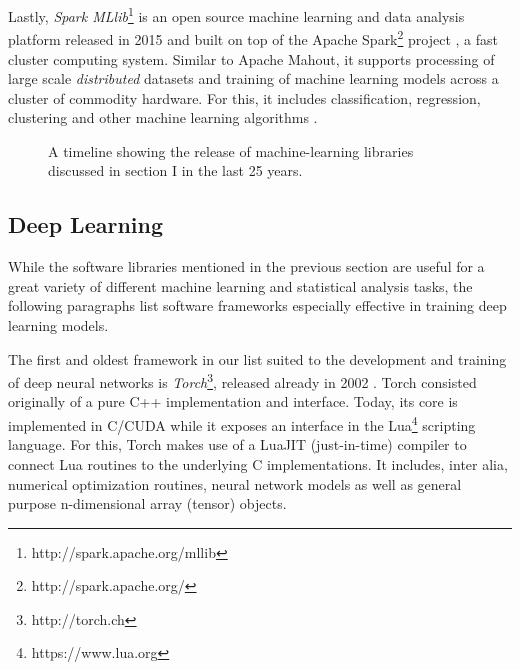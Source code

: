 Lastly, \emph{Spark MLlib}\footnote{http://spark.apache.org/mllib} is an
open source machine learning and data analysis platform released in 2015 and
built on top of the Apache Spark\footnote{http://spark.apache.org/} project
\cite{spark}, a fast cluster computing system. Similar to Apache Mahout, it
supports processing of large scale \emph{distributed} datasets and training of
machine learning models across a cluster of commodity hardware. For this, it
includes classification, regression, clustering and other machine learning
algorithms \cite{mllib}.

\begin{figure*}[t!]
\centering
\caption{A timeline showing the release of machine-learning libraries discussed
  in section I in the last 25 years.}
\label{fig:timeline}
\end{figure*}

\subsection{Deep Learning}\label{sec:history-dl}

While the software libraries mentioned in the previous section are useful for a
great variety of different machine learning and statistical analysis tasks, the
following paragraphs list software frameworks especially effective in training
deep learning models.

The first and oldest framework in our list suited to the development and
training of deep neural networks is \emph{Torch}\footnote{http://torch.ch},
released already in 2002 \cite{torch}. Torch consisted originally of a pure C++
implementation and interface. Today, its core is implemented in C/CUDA while it
exposes an interface in the Lua\footnote{https://www.lua.org} scripting
language. For this, Torch makes use of a LuaJIT (just-in-time) compiler to
connect Lua routines to the underlying C implementations. It includes, inter
alia, numerical optimization routines, neural network models as well as
general purpose n-dimensional array (tensor) objects.

